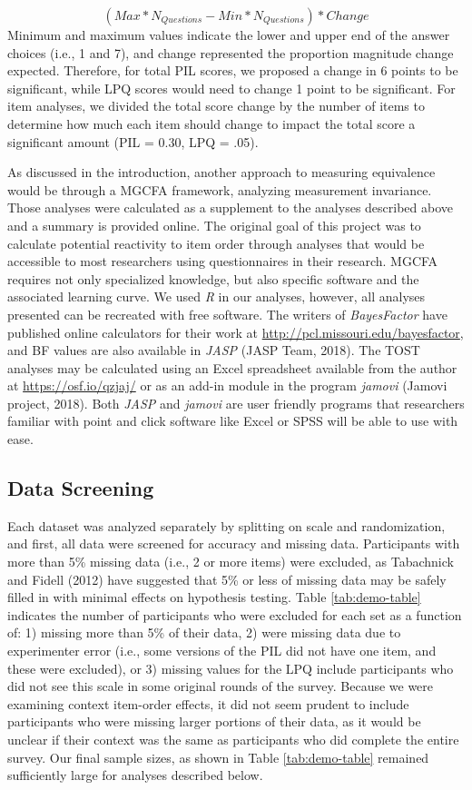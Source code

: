 \documentclass[english,man]{apa6}
\theoremstyle{definition}
\theoremstyle{definition}
\theoremstyle{definition}
\theoremstyle{remark}
\begin{document}
\[
(Max*N_{Questions} - Min*N_{Questions}) * Change
\] Minimum and maximum values indicate the lower and upper end of the
answer choices (i.e., 1 and 7), and change represented the proportion
magnitude change expected. Therefore, for total PIL scores, we proposed
a change in 6 points to be significant, while LPQ scores would need to
change 1 point to be significant. For item analyses, we divided the
total score change by the number of items to determine how much each
item should change to impact the total score a significant amount (PIL =
0.30, LPQ = .05).

As discussed in the introduction, another approach to measuring
equivalence would be through a MGCFA framework, analyzing measurement
invariance. Those analyses were calculated as a supplement to the
analyses described above and a summary is provided online. The original
goal of this project was to calculate potential reactivity to item order
through analyses that would be accessible to most researchers using
questionnaires in their research. MGCFA requires not only specialized
knowledge, but also specific software and the associated learning curve.
We used \emph{R} in our analyses, however, all analyses presented can be
recreated with free software. The writers of \emph{BayesFactor} have
published online calculators for their work at
\url{http://pcl.missouri.edu/bayesfactor}, and BF values are also
available in \emph{JASP} (JASP Team, 2018). The TOST analyses may be
calculated using an Excel spreadsheet available from the author at
\url{https://osf.io/qzjaj/} or as an add-in module in the program
\emph{jamovi} (Jamovi project, 2018). Both \emph{JASP} and \emph{jamovi}
are user friendly programs that researchers familiar with point and
click software like Excel or SPSS will be able to use with ease.

\subsection{Data Screening}\label{data-screening}

Each dataset was analyzed separately by splitting on scale and
randomization, and first, all data were screened for accuracy and
missing data. Participants with more than 5\% missing data (i.e., 2 or
more items) were excluded, as Tabachnick and Fidell (2012) have
suggested that 5\% or less of missing data may be safely filled in with
minimal effects on hypothesis testing. Table \ref{tab:demo-table}
indicates the number of participants who were excluded for each set as a
function of: 1) missing more than 5\% of their data, 2) were missing
data due to experimenter error (i.e., some versions of the PIL did not
have one item, and these were excluded), or 3) missing values for the
LPQ include participants who did not see this scale in some original
rounds of the survey. Because we were examining context item-order
effects, it did not seem prudent to include participants who were
missing larger portions of their data, as it would be unclear if their
context was the same as participants who did complete the entire survey.
Our final sample sizes, as shown in Table \ref{tab:demo-table} remained
sufficiently large for analyses described below.
\end{document}
